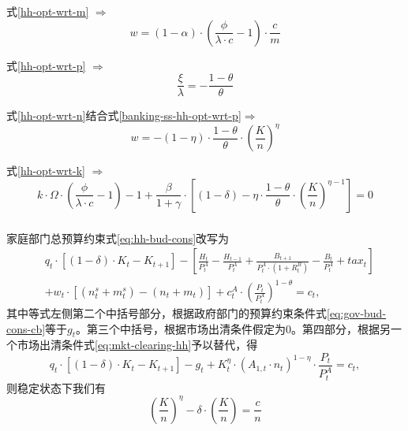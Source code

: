 式\eqref{hh-opt-wrt-m} $\Rightarrow$
\begin{equation}
  \label{banking-ss-hh-opt-wrt-m}
  w = (1-\alpha) \cdot \left(\frac{\phi}{\lambda \cdot c} - 1 \right)  \cdot \frac{c}{m}
\end{equation}

式\eqref{hh-opt-wrt-p} $\Rightarrow$
\begin{equation}
  \label{banking-ss-hh-opt-wrt-p}
  \frac{\xi}{\lambda} = - \frac{1-\theta}{\theta}
\end{equation}

式\eqref{hh-opt-wrt-n}结合式\eqref{banking-ss-hh-opt-wrt-p}$\Rightarrow$
\begin{equation}
  \label{banking-eq:ss-hh-opt-wrt-n}
  w = - {\left( 1-\eta \right)} \cdot \frac{1-\theta}{\theta} \cdot   {\left( \frac{K}{n} \right)}^{\eta}
\end{equation}

式\eqref{hh-opt-wrt-k} $\Rightarrow$
\begin{equation}
  \label{banking-ss-hh-opt-wrt-k}
  k \cdot \Omega \cdot {\left(
  \frac{\phi}{\lambda \cdot c} - 1
  \right)} - 1 + \frac{\beta}{1+\gamma} \cdot {\left[
  {\left( 1 - \delta \right)} - \eta \cdot \frac{1-\theta}{\theta} \cdot {\left(\frac{K}{n}\right)}^{\eta - 1}
  \right]} = 0
\end{equation}

\subsubsection{}
家庭部门总预算约束式\eqref{eq:hh-bud-cons}改写为
\begin{equation*}
\begin{split}
&q_t \cdot {\left[
(1-\delta) \cdot K_t - K_{t+1}
\right]}
- {\left[
\frac{H_{t}}{P_t^A} - \frac{H_{t-1}}{P_t^A} + \frac{B_{t+1}}{P_t^A \cdot (1+R_t^B)} - \frac{B_t}{P_t^A} + tax_t
\right]} \\
&+ w_t \cdot {\left[(n_t^s + m_t^s) - (n_t + m_t)\right]}
+ c_t^A \cdot {\left(\frac{P_t}{P_t^A}\right)}^{1-\theta} = c_t,
\end{split}
\end{equation*}
其中等式左侧第二个中括号部分，根据政府部门的预算约束条件式\eqref{eq:gov-bud-cons-cb}等于$g_t$。第三个中括号，根据市场出清条件假定为$0$。第四部分，根据另一个市场出清条件式\eqref{eq:mkt-clearing-hh}予以替代，得
\begin{equation*}
q_t \cdot {\left[
(1-\delta) \cdot K_t - K_{t+1}
\right]}
- g_t
+ K_t^{\eta} \cdot (A_{1,t} \cdot n_t)^{1-\eta} \cdot \frac{P_t}{P_t^A} = c_t,
\end{equation*}
则稳定状态下我们有
\begin{equation}
  \label{eq:banking-ss-hh-opt-wrt-wac}
  {\left(\frac{K}{n}\right)}^{\eta} - \delta \cdot {\left(\frac{K}{n}\right)} = \frac{c}{n}
\end{equation}
